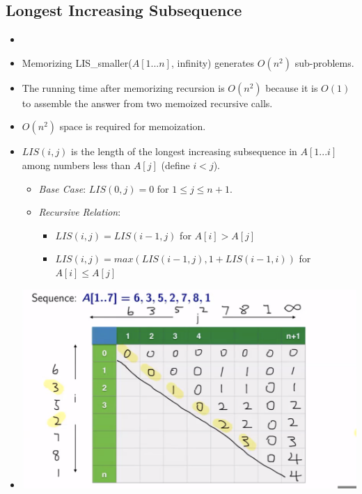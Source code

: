\subsection{Longest Increasing Subsequence}
\begin{itemize}
    \item[] 
    \item Memorizing LIS\_smaller($A[1...n]$, infinity) generates $O(n^2)$ sub-problems.
    \item The running time after memorizing recursion is $O(n^2)$ because it is $O(1)$ to assemble the answer from two memoized recursive calls.
    \item $O(n^2)$ space is required for memoization.
    \item $LIS(i, j)$ is the length of the longest increasing subsequence in $A[1...i]$ among numbers less than $A[j]$ (define $i < j$).
    \begin{itemize}
        \item \textit{Base Case}: $LIS(0, j) = 0$ for $1 \leq j \leq n + 1$.
        \item \textit{Recursive Relation}:
        \begin{itemize}
            \item $LIS(i, j) = LIS(i - 1, j)$ for $A[i] > A[j]$
            \item $LIS(i, j) = max(LIS(i - 1, j), 1 + LIS(i - 1, i))$ for $A[i] \leq A[j]$
        \end{itemize}
    \end{itemize}
    \item[] \includegraphics[width=\textwidth]{lecture13/images/lis-memo.png}
\end{itemize}
